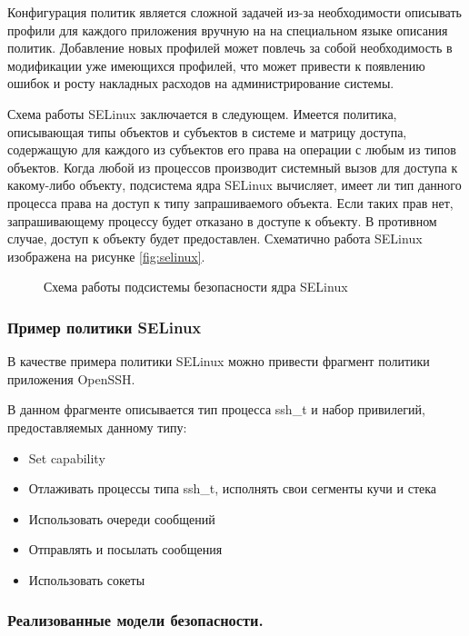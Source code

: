 Конфигурация политик является 
сложной задачей из-за необходимости
описывать профили для каждого приложения 
вручную на на специальном языке описания
политик. Добавление новых профилей может повлечь 
за собой необходимость в модификации уже имеющихся 
профилей, что может привести к появлению 
ошибок и росту накладных расходов на 
администрирование системы.  

Схема работы SELinux заключается в следующем.
Имеется политика, описывающая типы объектов
и субъектов в системе и матрицу доступа,
содержащую для каждого из субъектов его права
на операции с любым из типов объектов. Когда
любой из процессов производит системный вызов
для доступа к какому-либо объекту, подсистема
ядра SELinux вычисляет, имеет ли тип данного процесса
права на доступ к типу запрашиваемого объекта.
Если таких прав нет, запрашивающему процессу
будет отказано в доступе к объекту. В противном
случае, доступ к объекту будет предоставлен.
Схематично работа SELinux изображена на рисунке
\ref{fig:selinux}.

\begin{figure}
\centering
\subfloat{\label{fig:selinux}{}}
\caption{Схема работы подсистемы безопасности ядра SELinux}
\end{figure}

\subsubsection{Пример политики SELinux}

В качестве примера политики SELinux можно привести
фрагмент политики приложения OpenSSH.


В данном фрагменте описывается тип процесса ssh\_t и
набор привилегий, предоставляемых данному типу:
\begin{itemize}
\item Set capability
\item Отлаживать процессы типа ssh\_t, исполнять свои сегменты
        кучи и стека
\item Использовать очереди сообщений
\item Отправлять и посылать сообщения
\item Использовать сокеты
\end{itemize}

\subsubsection {Реализованные модели безопасности.} 

